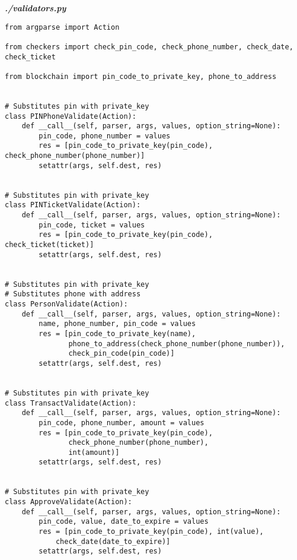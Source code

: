 \textit{\textbf{./validators.py}}
\begin{verbatim}
from argparse import Action

from checkers import check_pin_code, check_phone_number, check_date, check_ticket

from blockchain import pin_code_to_private_key, phone_to_address


# Substitutes pin with private_key
class PINPhoneValidate(Action):
    def __call__(self, parser, args, values, option_string=None):
        pin_code, phone_number = values
        res = [pin_code_to_private_key(pin_code), check_phone_number(phone_number)]
        setattr(args, self.dest, res)


# Substitutes pin with private_key
class PINTicketValidate(Action):
    def __call__(self, parser, args, values, option_string=None):
        pin_code, ticket = values
        res = [pin_code_to_private_key(pin_code), check_ticket(ticket)]
        setattr(args, self.dest, res)


# Substitutes pin with private_key
# Substitutes phone with address
class PersonValidate(Action):
    def __call__(self, parser, args, values, option_string=None):
        name, phone_number, pin_code = values
        res = [pin_code_to_private_key(name),
               phone_to_address(check_phone_number(phone_number)),
               check_pin_code(pin_code)]
        setattr(args, self.dest, res)


# Substitutes pin with private_key
class TransactValidate(Action):
    def __call__(self, parser, args, values, option_string=None):
        pin_code, phone_number, amount = values
        res = [pin_code_to_private_key(pin_code),
               check_phone_number(phone_number),
               int(amount)]
        setattr(args, self.dest, res)


# Substitutes pin with private_key
class ApproveValidate(Action):
    def __call__(self, parser, args, values, option_string=None):
        pin_code, value, date_to_expire = values
        res = [pin_code_to_private_key(pin_code), int(value), 
            check_date(date_to_expire)]
        setattr(args, self.dest, res)
\end{verbatim}

